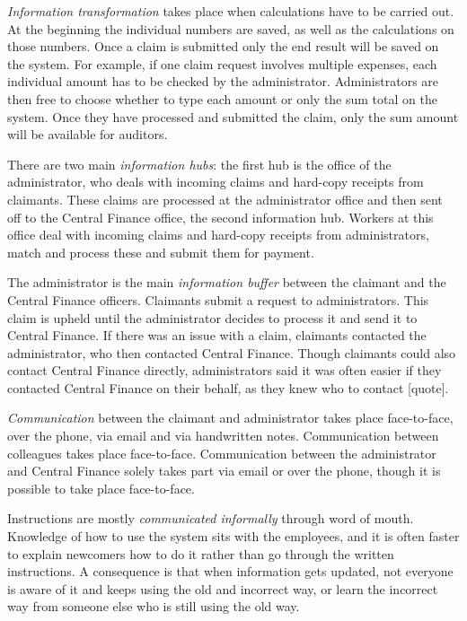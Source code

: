 \textit{Information transformation} takes place when calculations have to be carried out. At the beginning the individual numbers are saved, as well as the calculations on those numbers. Once a claim is submitted only the end result will be saved on the system. For example, if one claim request involves multiple expenses, each individual amount has to be checked by the administrator. Administrators are then free to choose whether to type each amount or only the sum total on the system. Once they have processed and submitted the claim, only the sum amount will be available for auditors. 

There are two main \textit{information hubs}: the first hub is the office of the administrator, who deals with incoming claims and hard-copy receipts from claimants. These claims are processed at the administrator office and then sent off to the Central Finance office, the second information hub. Workers at this office deal with incoming claims and hard-copy receipts from administrators, match and process these and submit them for payment. 

The administrator is the main\textit{ information buffer }between the claimant and the Central Finance officers. Claimants submit a request to administrators. This claim is upheld until the administrator decides to process it and send it to Central Finance. If there was an issue with a claim, claimants contacted the administrator, who then contacted Central Finance. Though claimants could also contact Central Finance directly, administrators said it was often easier if they contacted Central Finance on their behalf, as they knew who to contact [quote]. 

\textit{Communication} between the claimant and administrator takes place face-to-face, over the phone, via email and via handwritten notes. Communication between colleagues takes place face-to-face. Communication between the administrator and Central Finance solely takes part via email or over the phone, though it is possible to take place face-to-face.

Instructions are mostly \textit{communicated informally} through word of mouth. Knowledge of how to use the system sits with the employees, and it is often faster to explain newcomers how to do it rather than go through the written instructions. A consequence is that when information gets updated, not everyone is aware of it and keeps using the old and incorrect way, or learn the incorrect way from someone else who is still using the old way. 

